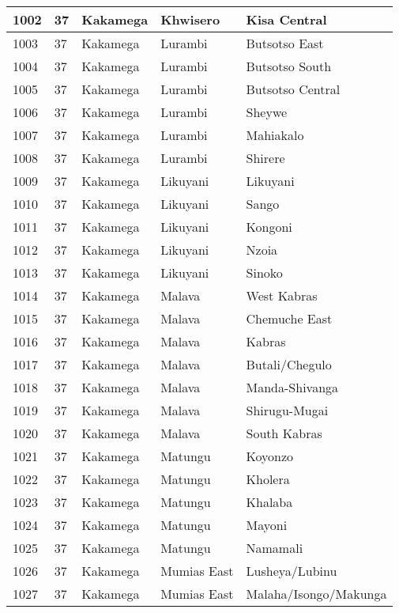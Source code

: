 \begin{table}[!ht]
\begin{tabular}{|l|l|l|l|l|}
        1002 & 37 & Kakamega & Khwisero & Kisa Central \\ \hline
        1003 & 37 & Kakamega & Lurambi & Butsotso East \\ \hline
        1004 & 37 & Kakamega & Lurambi & Butsotso South \\ \hline
        1005 & 37 & Kakamega & Lurambi & Butsotso Central \\ \hline
        1006 & 37 & Kakamega & Lurambi & Sheywe \\ \hline
        1007 & 37 & Kakamega & Lurambi & Mahiakalo \\ \hline
        1008 & 37 & Kakamega & Lurambi & Shirere \\ \hline
        1009 & 37 & Kakamega & Likuyani & Likuyani \\ \hline
        1010 & 37 & Kakamega & Likuyani & Sango \\ \hline
        1011 & 37 & Kakamega & Likuyani & Kongoni \\ \hline
        1012 & 37 & Kakamega & Likuyani & Nzoia \\ \hline
        1013 & 37 & Kakamega & Likuyani & Sinoko \\ \hline
        1014 & 37 & Kakamega & Malava & West Kabras \\ \hline
        1015 & 37 & Kakamega & Malava & Chemuche East \\ \hline
        1016 & 37 & Kakamega & Malava & Kabras \\ \hline
        1017 & 37 & Kakamega & Malava & Butali/Chegulo \\ \hline
        1018 & 37 & Kakamega & Malava & Manda-Shivanga \\ \hline
        1019 & 37 & Kakamega & Malava & Shirugu-Mugai \\ \hline
        1020 & 37 & Kakamega & Malava & South Kabras \\ \hline
        1021 & 37 & Kakamega & Matungu & Koyonzo \\ \hline
        1022 & 37 & Kakamega & Matungu & Kholera \\ \hline
        1023 & 37 & Kakamega & Matungu & Khalaba \\ \hline
        1024 & 37 & Kakamega & Matungu & Mayoni \\ \hline
        1025 & 37 & Kakamega & Matungu & Namamali \\ \hline
        1026 & 37 & Kakamega & Mumias East & Lusheya/Lubinu \\ \hline
        1027 & 37 & Kakamega & Mumias East & Malaha/Isongo/Makunga \\ \hline

\end{tabular}
\end{table}
